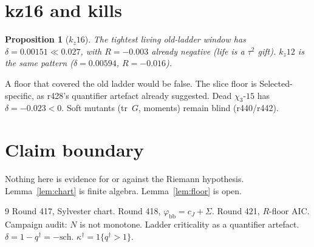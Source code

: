 \documentclass[11pt]{article}
\newtheorem{prop}{Proposition}
\newcommand{\qd}{q^{\dagger}}
\newcommand{\kapd}{\kappa^{\dagger}}
\newcommand{\phibb}{\varphi_{\mathrm{bb}}}
\begin{document}
\section{kz16 and kills}\label{sec:kills}

\begin{prop}[$k_z16$]\label{prop:kz16}
The tightest living old-ladder window has
$\delta=0.00151\ll 0.027$, with $R=-0.003$ already
negative (life is a $\tau^{2}$ gift).
$k_z12$ is the same pattern ($\delta=0.00594$,
$R=-0.016$).
\end{prop}

A floor that covered the old ladder would be false.
The slice floor is Selected-specific, as r428's
quantifier artefact already suggested.
Dead $\chi_3$-$15$ has $\delta=-0.023<0$.
Soft mutants (tr~$G$, moments) remain blind (r440/r442).

\section*{Claim boundary}

Nothing here is evidence for or against the Riemann
hypothesis.
Lemma~\ref{lem:chart} is finite algebra.
Lemma~\ref{lem:floor} is open.

\begin{thebibliography}{9}
 Round 417, Sylvester chart.
 Round 418, $\phibb=c_J+\Sigma$.
 Round 421, $R$-floor AIC.
 Campaign audit: $N$ is not monotone.
 Ladder criticality as a quantifier artefact.
 $\delta=1-\qd=-\mathrm{sch}$.
 $\kapd=1\{\qd>1\}$.
\end{thebibliography}
\end{document}
